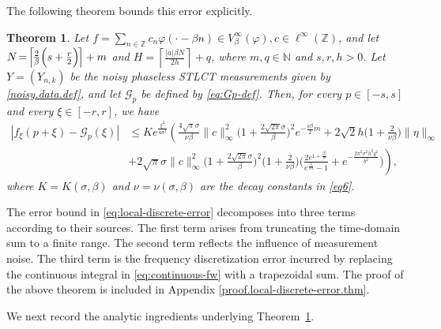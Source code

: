 \documentclass[11pt, reqno]{amsart}
\newtheorem{theorem}{Theorem}[section]
\newcommand{\N}{\mathbb{N}}
\newcommand{\Z}{\mathbb{Z}}
\numberwithin{equation}{section}
\begin{document}
The following theorem bounds this error explicitly.

\begin{theorem}\label{local-discrete-error.thm}
Let $f=\sum_{n\in\Z} c_n\varphi(\cdot-\beta n)\in V_\beta^\infty(\varphi), c\in\ell^\infty(\Z)$,
and let $N\hskip-.02in=\hskip-.02in\left\lceil \hskip-.02in\frac{2}{\beta}\Bigl(s+\frac{r}{2}\Bigr)\hskip-.02in\right\rceil+m$ and 
$H=\left\lceil \frac{|a|\beta N}{2h}\right\rceil+q$, 
where $m,q\in\N$ and $s,r,h>0$. Let $Y=(Y_{n,k})$  be the noisy phaseless STLCT measurements   given by \eqref{noisy.data.def}, and let $\mathcal G_p$ be defined by \eqref{eq:Gp-def}. Then, for every $p\in[-s,s]$ and every $\xi\in[-r,r]$, we have
\begin{align}\label{eq:local-discrete-error}
|f_\xi(p+\xi)-\mathcal G_p(\xi)|& \le Ke^{\frac{\xi^2}{4\sigma^2}} \left( \frac{4\sqrt{\pi}\sigma}{\nu\beta}\|c\|_\infty^2\Big(1+\frac{2\sqrt{2\pi}\sigma}{\beta}\Big)^2e^{-\frac{\nu\beta}{2}m} 
+2\sqrt{2}h\Big(1+\frac{2}{\nu\beta}\Big)\|\eta\|_\infty \right.
\nonumber\\
&\left.+2\sqrt{\pi}\sigma\|c\|_\infty^2\Big(1+\frac{2\sqrt{2\pi}\sigma}{\beta}\Big)^2 \big(1+\frac{2}{\nu\beta}\big)
\Big(\frac{2e^{1+\frac{|\xi|}{\sigma}}}{e^{\frac{b}{\sigma h}}-1}
+e^{-\frac{2\pi^2\sigma^2 h^2 q^2}{b^2}}\Big)\right),
\end{align}
where $K=K(\sigma,\beta)$ and $\nu=\nu(\sigma,\beta)$ are the decay constants in \eqref{eq6}.
\end{theorem}


The error bound in  \eqref{eq:local-discrete-error} decomposes into three terms according to their sources. The first term arises from truncating the time-domain sum to a finite range. The second term reflects the influence of measurement noise. The third term is the frequency discretization error incurred by replacing the continuous integral in \eqref{eq:continuous-fw} with a trapezoidal sum. The proof of the above theorem is included in Appendix \ref{proof.local-discrete-error.thm}. 


We next record the analytic ingredients underlying Theorem~\ref{local-discrete-error.thm}.
\end{document}
